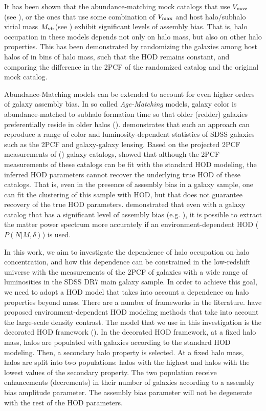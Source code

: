 It has been shown that the abundance-matching mock catalogs that use $V_{\rm max}$ (see \citealt{hw2013,arz2014}), or the ones that use some combination of $V_{\rm max}$ and host halo/subhalo virial mass $M_{\rm vir} $(see \citealt{lehman2015}) exhibit significant levels of assembly bias. That is, halo occupation in these models depends not only on halo mass, but also on other halo properties. This has been demonstrated by randomizing the galaxies among host halos of in bins of halo mass, such that the HOD remains constant, and comparing the difference in the 2PCF of the randomized catalog and the original mock catalog.  

Abundance-Matching models can be extended to account for even higher orders of galaxy 
assembly bias. In so called \emph{Age-Matching} models, galaxy color is abundance-matched
to subhalo formation time so that older (redder) galaxies preferentially reside in older halos (\citealt{hw2013}). \citet{hearin2014} demonstrates that such an approach can reproduce a range of color and luminosity-dependent statistics of SDSS galaxies such as the 2PCF and galaxy-galaxy lensing. Based on the projected 2PCF measurements of (\citealt{hw2013}) galaxy catalogs, \citet{arz2014} showed that although the 2PCF measurements of these catalogs can be fit with the standard HOD modeling, the inferred HOD parameters cannot recover the underlying true HOD of these catalogs. That is, even in the presence of assembly bias in a galaxy sample, one can fit the clustering of this sample with HOD, but that does not guarantee recovery of the true HOD parameters. \citet{mcewen2016} demonstrated that even with a galaxy catalog that has a significant level of assembly bias (e.g. \citealt{hw2013}), it is possible to extract the matter power spectrum more accurately if an environment-dependent HOD ($P(N|M,\delta)$) is used. 

In this work, we aim to investigate the dependence of halo occupation on halo concentration, and how this dependence can be constrained in the low-redshift universe with the measurements of the 2PCF of galaxies with a wide range of luminosities in the SDSS DR7 main galaxy sample. 
In order to achieve this goal, we need to adopt a HOD model that takes into account 
a dependence on halo properties beyond mass. There are a number of frameworks in the literature. \citet{edHOD-tinker,edHOD-gillmartin,edHOD-weinberg} have proposed environment-dependent HOD modeling methods that take into account the large-scale density contrast. The model that we use in this investigation is the decorated HOD framework (\citealt{decorated}). In the decorated HOD framework, at a fixed halo mass, halos are populated with galaxies according to the standard HOD modeling. Then, a secondary halo property is selected. At a fixed halo mass, halos are split into two populations: halos with the highest and halos with the lowest values of the secondary property. The two population receive enhancements (decrements) in their number of galaxies according to a assembly bias amplitude parameter. The assembly bias parameter will not be degenerate with the rest of the HOD parameters. 

